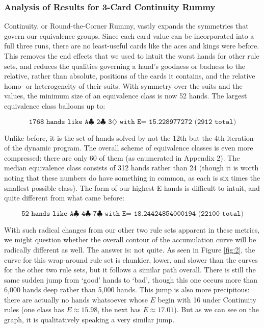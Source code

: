 \documentclass[letter,12pt]{article}
\begin{document}
\subsubsection{Analysis of Results for 3-Card Continuity Rummy}

Continuity, or Round-the-Corner Rummy, vastly expands the symmetries that govern our equivalence groups. Since each card value can be incorporated into a full three runs, there are no least-useful cards like the aces and kings were before. This removes the end effects that we used to intuit the worst hands for other rule sets, and reduces the qualities governing a hand’s goodness or badness to the relative, rather than absolute, positions of the cards it contains, and the relative homo- or heterogeneity of their suits. With symmetry over the suits and the values, the minimum size of an equivalence class is now 52 hands. The largest equivalence class balloons up to: 

$$\texttt{1768 hands like A$\clubsuit$ 2$\clubsuit$ 3$\diamondsuit$ with E= 15.228977272 (2912 total)}$$

Unlike before, it is the set of hands solved by not the 12th but the 4th iteration of the dynamic program. The overall scheme of equivalence classes is even more compressed: there are only 60 of them (as enumerated in Appendix 2). The median equivalence class consists of 312 hands rather than 24 (though it is worth noting that these numbers do have something in common, as each is six times the smallest possible class). The form of our highest-E hands is difficult to intuit, and quite different from what came before: 

$$\texttt{52 hands like A$\clubsuit$  4$\clubsuit$  7$\clubsuit$  with E= 18.24424854000194 (22100 total)}$$

With such radical changes from our other two rule sets apparent in these metrics, we might question whether the overall contour of the accumulation curve will be radically different as well. The answer is: not quite. As seen in Figure \ref{fig:2}, the curve for this wrap-around rule set is chunkier, lower, and slower than the curves for the other two rule sets, but it follows a similar path overall. There is still the same sudden jump from ‘good’ hands to ‘bad’, though this one occurs more than 6,000 hands deep rather than 5,000 hands. This jump is also more precipitous: there are  actually no hands whatsoever whose $E$ begin with 16 under Continuity rules (one class has $E \approx 15.98$, the next has $E \approx 17.01$). But as we can see on the graph, it is qualitatively speaking a very similar jump. 
\end{document}
